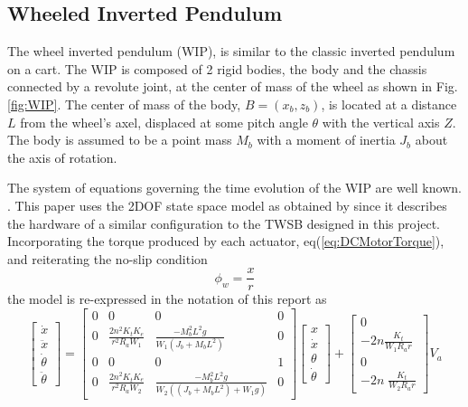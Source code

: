         \subsection{Wheeled Inverted Pendulum}
    The wheel inverted pendulum (WIP), is similar to the classic inverted pendulum on a cart. 
    The WIP is composed of 2 rigid bodies, the body and the chassis connected by a revolute joint, 
    at the center of mass of the wheel as shown in Fig.\ref{fig:WIP}. 
    The center of mass of the body, $B=(x_b,z_b)$, 
    is located at a distance $L$ from the wheel's axel, displaced at some pitch angle $\theta$ with 
    the vertical axis $Z$. The body is assumed to be a point mass $M_b$ with a moment of inertia $J_b$ 
    about the axis of rotation. 
        
    The system of equations governing the time evolution of the WIP are well known.
        \cite{frankovsky2017modeling} \cite{ModelingWIPLagrange}.
    This paper uses the 2DOF state space model as obtained by \cite{Velazquez2016VelocityAM} since it describes 
    the hardware of a similar configuration to the TWSB designed in this project. 
    Incorporating the torque produced by each actuator, eq(\ref{eq:DCMotorTorque}),
    and reiterating the no-slip condition 
        \begin{equation}
            \phi_w = \frac{x}{r}
        \end{equation}
    the model is re-expressed in the notation of this report as 
        \begin{equation}
            \begin{bmatrix}
            \dot{x} \\
            \ddot{x} \\
            \dot{\theta} \\
            \ddot{\theta} 
            \end{bmatrix} =
            \begin{bmatrix}
            0 & 0 & 0 & 0\\
            0 & \frac{2n^2 K_t K_e }{r^2 R_a W_1 } & \frac{-M_b^2 L^2 g}{W_1 \left(J_b +M_b L^2 \right)} & 0\\
            0 & 0 & 0 & 1\\
            0 & \frac{2n^2 K_t K_e }{r^2 R_a W_2 } & \frac{-M_b^2 L^2 g}{W_2 \left(\left(J_b +M_b L^2 \right)+W_1 g\right)} & 0
            \end{bmatrix}
            \begin{bmatrix}
    x\\
            \dot{x} \\
            \theta \\
            \dot{\theta} 
            \end{bmatrix} +
            \begin{bmatrix}
            0\\
            -2n\frac{K_t }{W_1 R_a r}\\
            0\\
            -2n\;\frac{K_t }{W_2 R_a r}
            \end{bmatrix}
    V_a
        \label{eq:2DOF}
        \end{equation}

